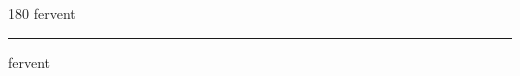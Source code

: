 
\begin{frame}
\begin{center}
\begin{turn}{180}
{\fontsize{2.5cm}{1em}\selectfont fervent}
\end{turn}
\vspace{1em}\par  
\hrule
\vspace{1em}\par  
{\fontsize{2.5cm}{1em}\selectfont fervent}
\end{center}
\end{frame}
